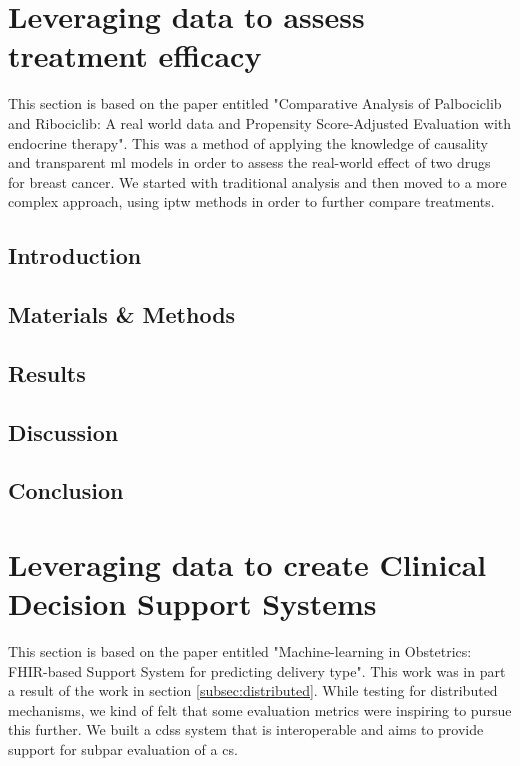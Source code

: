 \section{Leveraging data to assess treatment efficacy}\label{subsec:ipop}
This section is based on the paper entitled "Comparative Analysis of Palbociclib and Ribociclib: A real world data and Propensity Score-Adjusted Evaluation with endocrine therapy". This was a method of applying the knowledge of causality and transparent \ac{ml} models in order to assess the real-world effect of two drugs for breast cancer. We started with traditional analysis and then moved to a more complex approach, using \ac{iptw} methods in order to further compare treatments.


\subsection{Introduction}

\subsection{Materials \& Methods}

\subsection{Results}

\subsection{Discussion}

\subsection{Conclusion}





\section{Leveraging data to create Clinical Decision Support Systems}\label{subsec:obs}
This section is based on the paper entitled "Machine-learning in Obstetrics: FHIR-based Support System for predicting delivery type". This work was in part a result of the work in section \ref{subsec:distributed}. While testing for distributed mechanisms, we kind of felt that some evaluation metrics were inspiring to pursue this further. We built a \ac{cdss} system that is interoperable and aims to provide support for subpar evaluation of a \ac{cs}.


